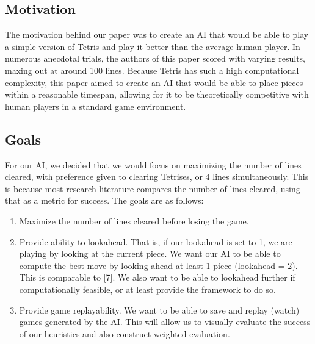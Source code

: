 \documentclass[11pt]{article}
\begin{document}
\subsection{Motivation}
The motivation behind our paper was to create an AI that would be able to play a simple version of Tetris and play it better than the average human player. In numerous anecdotal trials, the authors of this paper scored with varying results, maxing out at around 100 lines. Because Tetris has such a high computational complexity, this paper aimed to create an AI that would be able to place pieces within a reasonable timespan, allowing for it to be theoretically competitive with human players in a standard game environment. 

\subsection{Goals}
For our AI, we decided that we would focus on maximizing the number of lines cleared, with preference given to clearing Tetrises, or 4 lines simultaneously. This is because most research literature compares the number of lines cleared, using that as a metric for success. The goals are as follows:
\begin{enumerate}
\item Maximize the number of lines cleared before losing the game.
\item Provide ability to lookahead. That is, if our lookahead is set to 1, we are playing by looking at the current piece. We want our AI to be able to compute the best move by looking ahead at least 1 piece (lookahead = 2). This is comparable to [7]. We also want to be able to lookahead further if computationally feasible, or at least provide the framework to do so.
\item Provide game replayability. We want to be able to save and replay (watch) games generated by the AI. This will allow us to visually evaluate the success of our heuristics and also construct weighted evaluation.
\end{enumerate}
\end{document}
